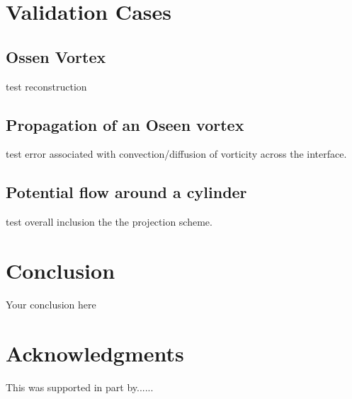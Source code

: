 \documentclass{article}
\begin{document}
\section{Validation Cases}

\subsection{Ossen Vortex}
test reconstruction

\subsection{Propagation of an Oseen vortex}
test error associated with convection/diffusion of vorticity across the interface.
\subsection{Potential flow around a cylinder}
test overall inclusion the the projection scheme. 







 
\section{Conclusion}
Your conclusion here

\section*{Acknowledgments}
This was supported in part by......

  
  
\end{document}

